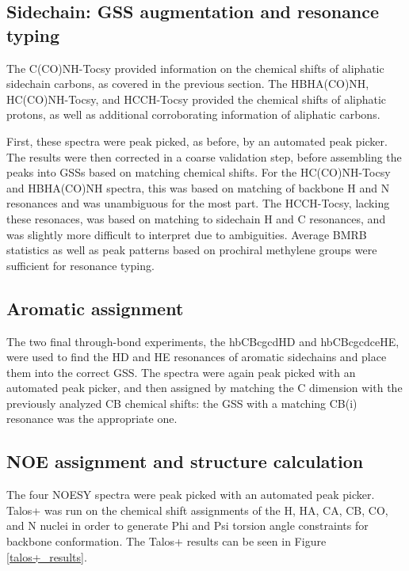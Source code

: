 \subsection*{Sidechain: GSS augmentation and resonance typing}
The C(CO)NH-Tocsy provided information on the chemical shifts of aliphatic
sidechain carbons, as covered in the previous section.  The HBHA(CO)NH, 
HC(CO)NH-Tocsy, and HCCH-Tocsy provided the chemical shifts of aliphatic
protons, as well as additional corroborating information of aliphatic carbons.

First, these spectra were peak picked, as before, by an automated peak picker.
The results were then corrected in a coarse validation step, before assembling
the peaks into GSSs based on matching chemical shifts.  For the HC(CO)NH-Tocsy
and HBHA(CO)NH spectra, this was based on matching of backbone H and N
resonances and was unambiguous for the most part.  The HCCH-Tocsy, lacking these
resonaces, was based on matching to sidechain H and C resonances, and was
slightly more difficult to interpret due to ambiguities.  
Average BMRB statistics as well as peak patterns based on prochiral methylene
groups were sufficient for resonance typing.

\subsection*{Aromatic assignment}
The two final through-bond experiments, the hbCBcgcdHD and hbCBcgcdceHE, were
used to find the HD and HE resonances of aromatic sidechains and place them
into the correct GSS.  The spectra were again peak picked with an automated
peak picker, and then assigned by matching the C dimension with the previously
analyzed CB chemical shifts: the GSS with a matching CB(i) resonance was the
appropriate one.

\subsection*{NOE assignment and structure calculation}
The four NOESY spectra were peak picked with an automated peak picker.  
Talos+ \cite{talos+} was run on the chemical shift assignments of the H, HA,
CA, CB, CO, and N nuclei in order to generate Phi and Psi torsion angle 
constraints for backbone conformation.
The Talos+ results can be seen in Figure \ref{talos+_results}.

